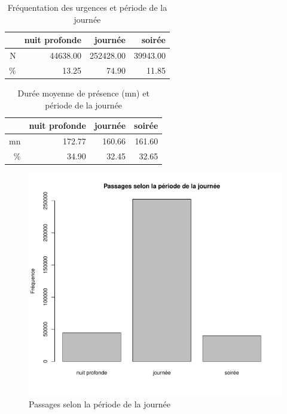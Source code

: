 \documentclass[12pt,english,french,twoside]{book}\usepackage[]{graphicx}\usepackage[]{color}
\makeatletter
\def\maxwidth{ %
  \ifdim\Gin@nat@width>\linewidth
    \linewidth
  \else
    \Gin@nat@width
  \fi
}
\newenvironment{knitrout}{}{} %
\makeatother
\begin{document}
\begin{table}[ht]
\centering
\begin{tabular}{rrrr}
  \hline
 & nuit profonde & journée & soirée \\ 
  \hline
N & 44638.00 & 252428.00 & 39943.00 \\ 
  \% & 13.25 & 74.90 & 11.85 \\ 
   \hline
\end{tabular}
\caption[Fréquentation des SU et période]{Fréquentation des urgences et période de la journée} 
\label{tab:freq_periode}
\end{table}
\begin{table}[ht]
\centering
\begin{tabular}{rrrr}
  \hline
 & nuit profonde & journée & soirée \\ 
  \hline
mn & 172.77 & 160.66 & 161.60 \\ 
  \% & 34.90 & 32.45 & 32.65 \\ 
   \hline
\end{tabular}
\caption[Durée de présence et période]{Durée  moyenne de présence (mn) et période de la journée} 
\label{duree_periode}
\end{table}



\begin{figure}[ht!]
 \centering
\begin{knitrout}
\color{fgcolor}
\includegraphics[width=\maxwidth]{figure/bp_periode} 

\end{knitrout}

 \caption{Passages selon la période de la journée}
 \label{fig:bp_periode}
\end{figure}
\end{document}
